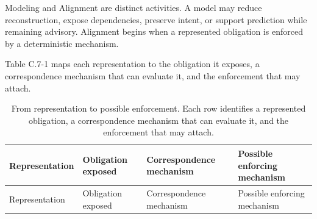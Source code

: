 

Modeling and Alignment are distinct activities. A model may reduce reconstruction, expose dependencies, preserve intent, or support prediction while remaining advisory. Alignment begins when a represented obligation is enforced by a deterministic mechanism.

Table C.7-1 maps each representation to the obligation it exposes, a correspondence mechanism that can evaluate it, and the enforcement that may attach.

{\footnotesize
\begin{longtable}[]{@{}
  >{\raggedright\arraybackslash}p{}
  >{\raggedright\arraybackslash}p{}
  >{\raggedright\arraybackslash}p{}
  >{\raggedright\arraybackslash}p{}@{}}
\caption[Representation to enforcement receipt]{From representation to possible enforcement. Each row identifies a represented obligation, a correspondence mechanism that can evaluate it, and the enforcement that may attach.}\tabularnewline
\toprule\noalign{}
\begin{minipage}[b]{\linewidth}\raggedright
Representation
\end{minipage} & \begin{minipage}[b]{\linewidth}\raggedright
Obligation exposed
\end{minipage} & \begin{minipage}[b]{\linewidth}\raggedright
Correspondence mechanism
\end{minipage} & \begin{minipage}[b]{\linewidth}\raggedright
Possible enforcing mechanism
\end{minipage} \\
\midrule\noalign{}
\endfirsthead
\toprule\noalign{}
\begin{minipage}[b]{\linewidth}\raggedright
Representation
\end{minipage} & \begin{minipage}[b]{\linewidth}\raggedright
Obligation exposed
\end{minipage} & \begin{minipage}[b]{\linewidth}\raggedright
Correspondence mechanism
\end{minipage} & \begin{minipage}[b]{\linewidth}\raggedright
Possible enforcing mechanism

\end{minipage}
\end{longtable}}
